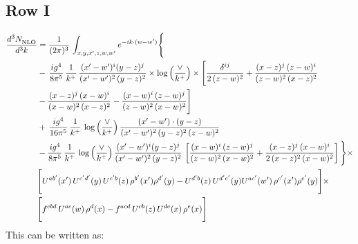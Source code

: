 \documentclass[9pt]{article}
\numberwithin{equation}{section}
\begin{document}
\subsection{Row I}
\begin{align}
     \frac{d^{3}N_{\rm NLO}^{\rm}}{d^{3}k}  & =   \frac{1}{(2\pi)^{3}}\, \int_{x,y,x',z,w,w^{\prime}} e^{-ik\cdot (w-w')} \Bigg\{\notag \\
& -\,\frac{ig^{4}}{8\pi^{5}}\,\frac{1}{k^{+}}\,\frac{(x'-w')^{i}(y-z)^{j}}{(x'-w')^{2}\,(y-z)^{2}}\times \log{\left(\frac{\vee}{k^{+}}\right)}\times \Bigg[\frac{\delta^{ij}}{2\,(z-w)^{2}}+\frac{(x-z)^{j}\,(z-w)^{i}}{(z-w)^{2}\,(x-z)^{2}}\notag \\ & -\frac{(x-z)^{j}\,(x-w)^{i}}{(x-w)^{2}\,(x-z)^{2}}-\frac{(x-w)^{i}\,(z-w)^{j}}{(z-w)^{2}\,(x-w)^{2}}\Bigg] \notag \\
& +\,\frac{ig^{4}}{16\pi^{5}}\,\frac{1}{k^{+}}\,\log{\left(\frac{\vee}{k^{+}}\right)}\, \frac{(x'-w')\cdot (y-z)}{(x'-w')^{2}\,(y-z)^{2}\,(z-w)^{2}} \notag \\
& -\frac{ig^{4}}{8\pi^{5}}\,\frac{1}{k^{+}}\,\log{\left(\frac{\vee}{k^{+}}\right)}\,\frac{(x'-w')^{i}(y-z)^{j}}{(x'-w')^{2}\,(y-z)^{2}}\,\left[\frac{(x-w)^{i}\,(z-w)^{j}}{(z-w)^{2}\,(x-w)^{2}}+\frac{(x-z)^{j}\,(x-w)^{i}}{2\,(x-z)^{2}\, (x-w)^{2}}\right]\Bigg\}\times \notag \\ &  \Bigg[U^{ab'}(x')\,U^{c'd'}(y)\,U^{c'b}(z)\,\rho^{b'}(x')\rho^{d'}(y)-U^{d'b}(z)\,U^{d'e'}(y)U^{ac'}(w')\,\rho^{c'}(x')\rho^{e'}(y)\Bigg]\times\notag \\ & \Bigg[f^{cbd}\,U^{ac}(w)\,\rho^{d}(x)-f^{acd}\, U^{cb}(z)\,U^{de}(x)\,\rho^{e}(x)\Bigg]
\end{align}
This can be written as: 
\end{document}
